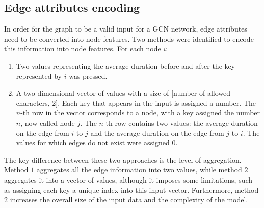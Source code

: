 \subsection{Edge attributes encoding}
In order for the graph to be a valid input for a GCN network, edge attributes need to be converted into node features. Two methods were identified to encode this information into node features. For each node $i$:
\begin{enumerate}
	\item Two values representing the average duration before and after the key represented by $i$ was pressed.
	\item A two-dimensional vector of values with a size of [number of allowed characters, 2]. Each key that appears in the input is assigned a number. The $n$-th row in the vector corresponds to a node, with a key assigned the number $n$, now called node $j$. The $n$-th row contains two values: the average duration on the edge from $i$ to $j$ and the average duration on the edge from $j$ to $i$. The values for which edges do not exist were assigned 0.
\end{enumerate}
The key difference between these two approaches is the level of aggregation. Method $1$ aggregates all the edge information into two values, while method $2$ aggregates it into a vector of values, although it imposes some limitations, such as assigning each key a unique index into this input vector. Furthermore, method $2$ increases the overall size of the input data and the complexity of the model.


